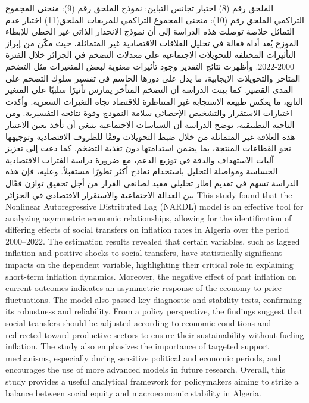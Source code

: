 \documentclass[12pt,a4paper]{report}
\begin{document}
الملحق رقم (8) اختبار تجانس التباين: نموذج 
الملحق رقم (9): منحنى المجموع التراكمي   
الملحق رقم (10): منحنى المجموع التراكمي للمربعات 
الملحق(11) اختبار عدم التماثل 
خلاصة
توصلت هذه الدراسة إلى أن نموذج الانحدار الذاتي غير الخطي للإبطاء الموزع يُعد أداة فعالة في تحليل العلاقات الاقتصادية غير المتماثلة، حيث مكّن من إبراز التأثيرات المختلفة للتحويلات الاجتماعية على معدلات التضخم في الجزائر خلال الفترة 2000-2022. وأظهرت نتائج التقدير وجود تأثيرات معنوية لبعض المتغيرات مثل التضخم المتأخر والتحويلات الإيجابية، ما يدل على دورها الحاسم في تفسير سلوك التضخم على المدى القصير. كما بينت الدراسة أن التضخم المتأخر يمارس تأثيرًا سلبيًا على المتغير التابع، ما يعكس طبيعة الاستجابة غير المتناظرة للاقتصاد تجاه التغيرات السعرية. وأكدت اختبارات الاستقرار والتشخيص الإحصائي سلامة النموذج وقوة نتائجه التفسيرية. ومن الناحية التطبيقية، توضح الدراسة أن السياسات الاجتماعية ينبغي أن تأخذ بعين الاعتبار هذه العلاقة غير المتماثلة من خلال ضبط التحويلات وفقًا للظروف الاقتصادية وتوجيهها نحو القطاعات المنتجة، بما يضمن استدامتها دون تغذية التضخم. كما دعت إلى تعزيز آليات الاستهداف والدقة في توزيع الدعم، مع ضرورة دراسة الفترات الاقتصادية الحساسة ومواصلة التحليل باستخدام نماذج أكثر تطورًا مستقبلاً. وعليه، فإن هذه الدراسة تسهم في تقديم إطار تحليلي مفيد لصانعي القرار من أجل تحقيق توازن فعّال بين العدالة الاجتماعية والاستقرار الاقتصادي في الجزائر
This study found that the Nonlinear Autoregressive Distributed Lag (NARDL) model is an effective tool for analyzing asymmetric economic relationships, allowing for the identification of differing effects of social transfers on inflation rates in Algeria over the period 2000–2022. The estimation results revealed that certain variables, such as lagged inflation and positive shocks to social transfers, have statistically significant impacts on the dependent variable, highlighting their critical role in explaining short-term inflation dynamics. Moreover, the negative effect of past inflation on current outcomes indicates an asymmetric response of the economy to price fluctuations. The model also passed key diagnostic and stability tests, confirming its robustness and reliability. From a policy perspective, the findings suggest that social transfers should be adjusted according to economic conditions and redirected toward productive sectors to ensure their sustainability without fueling inflation. The study also emphasizes the importance of targeted support mechanisms, especially during sensitive political and economic periods, and encourages the use of more advanced models in future research. Overall, this study provides a useful analytical framework for policymakers aiming to strike a balance between social equity and macroeconomic stability in Algeria.
\end{document}
